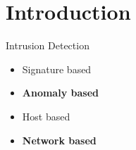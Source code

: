 \section{Introduction}
\begin{frame}

Intrusion Detection
\begin{itemize}
	\item Signature based
	\item \textbf{Anomaly based}
	\item Host based
	\item \textbf{Network based}
\end{itemize}

\end{frame}